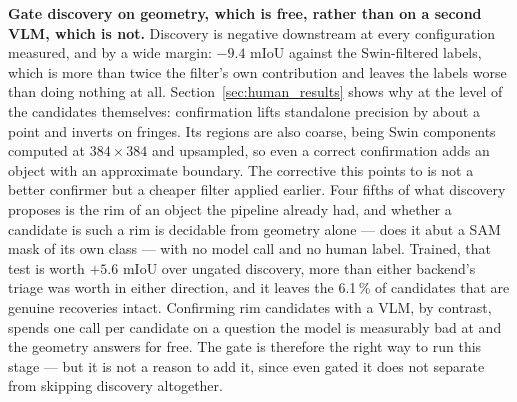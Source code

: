 \documentclass[conference]{IEEEtran}
\begin{document}
\textbf{Gate discovery on geometry, which is free, rather than on a second VLM, which is not.}
Discovery is negative downstream at every configuration measured, and by a wide margin: $-9.4$ mIoU
against the Swin-filtered labels, which is more than twice the filter's own contribution and leaves
the labels worse than doing nothing at all. Section~\ref{sec:human_results} shows why at the level of
the candidates themselves: confirmation lifts
standalone precision by about a point and inverts on fringes. Its regions are also coarse,
being Swin components computed at $384{\times}384$ and upsampled, so even a correct confirmation adds
an object with an approximate boundary.
The corrective this points to is not a better confirmer but a cheaper filter applied earlier.
Four fifths of what discovery proposes is the rim of an object the pipeline already had, and whether a
candidate is such a rim is decidable from geometry alone --- does it abut a SAM mask of its own class
--- with no model call and no human label. Trained, that test is worth $+5.6$ mIoU over ungated
discovery, more than either backend's triage was worth in either direction, and it leaves the
6.1\,\% of candidates that are genuine recoveries intact. Confirming rim candidates with a VLM, by
contrast, spends one call per candidate on a question the model is measurably bad at and the geometry
answers for free. The gate is therefore the right way to run this stage --- but it is not a reason to
add it, since even gated it does not separate from skipping discovery altogether.
\end{document}
